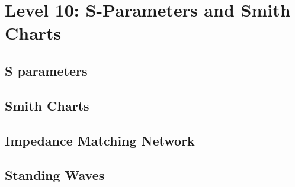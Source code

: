 
\section{Level 10: S-Parameters and Smith Charts}
\subsection{S parameters}
\subsection{Smith Charts}
\subsection{Impedance Matching Network}
\subsection{Standing Waves}